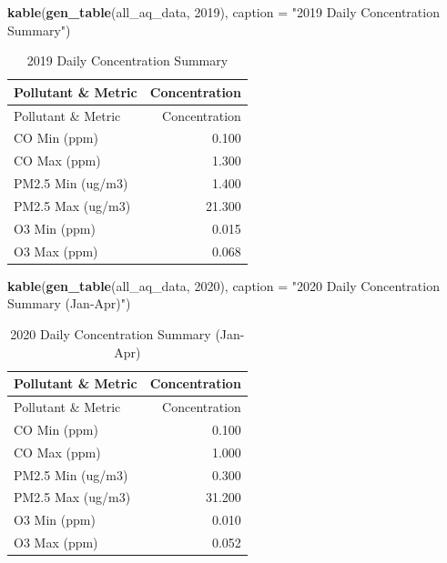 \documentclass[
]{article}
\newenvironment{Shaded}{\begin{snugshade}}{\end{snugshade}}
\newcommand{\AttributeTok}[1]{\textcolor[rgb]{0.13,0.29,0.53}{#1}}
\newcommand{\DecValTok}[1]{\textcolor[rgb]{0.00,0.00,0.81}{#1}}
\newcommand{\FunctionTok}[1]{\textcolor[rgb]{0.13,0.29,0.53}{\textbf{#1}}}
\newcommand{\NormalTok}[1]{#1}
\newcommand{\StringTok}[1]{\textcolor[rgb]{0.31,0.60,0.02}{#1}}
\begin{document}
\begin{Shaded}
\begin{Highlighting}[]
\FunctionTok{kable}\NormalTok{(}\FunctionTok{gen\_table}\NormalTok{(all\_aq\_data, }\DecValTok{2019}\NormalTok{), }\AttributeTok{caption =} \StringTok{"2019 Daily Concentration Summary"}\NormalTok{)}
\end{Highlighting}
\end{Shaded}

\begin{longtable}[]{@{}lr@{}}
\caption{2019 Daily Concentration Summary}\tabularnewline
\toprule\noalign{}
Pollutant \& Metric & Concentration \\
\midrule\noalign{}
\endfirsthead
\toprule\noalign{}
Pollutant \& Metric & Concentration \\
\midrule\noalign{}
\endhead
\bottomrule\noalign{}
\endlastfoot
CO Min (ppm) & 0.100 \\
CO Max (ppm) & 1.300 \\
PM2.5 Min (ug/m3) & 1.400 \\
PM2.5 Max (ug/m3) & 21.300 \\
O3 Min (ppm) & 0.015 \\
O3 Max (ppm) & 0.068 \\
\end{longtable}

\begin{Shaded}
\begin{Highlighting}[]
\FunctionTok{kable}\NormalTok{(}\FunctionTok{gen\_table}\NormalTok{(all\_aq\_data, }\DecValTok{2020}\NormalTok{), }\AttributeTok{caption =} \StringTok{"2020 Daily Concentration Summary (Jan{-}Apr)"}\NormalTok{)}
\end{Highlighting}
\end{Shaded}

\begin{longtable}[]{@{}lr@{}}
\caption{2020 Daily Concentration Summary (Jan-Apr)}\tabularnewline
\toprule\noalign{}
Pollutant \& Metric & Concentration \\
\midrule\noalign{}
\endfirsthead
\toprule\noalign{}
Pollutant \& Metric & Concentration \\
\midrule\noalign{}
\endhead
\bottomrule\noalign{}
\endlastfoot
CO Min (ppm) & 0.100 \\
CO Max (ppm) & 1.000 \\
PM2.5 Min (ug/m3) & 0.300 \\
PM2.5 Max (ug/m3) & 31.200 \\
O3 Min (ppm) & 0.010 \\
O3 Max (ppm) & 0.052 \\
\end{longtable}
\end{document}
